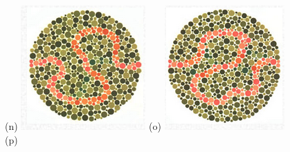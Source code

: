 \documentclass[	12pt, Times, openright, twoside, a4paper, english, brazil]{abntex2}
\begin{document}
\begin{apendicesenv}
\begin{figure}[!htb]
(n)
\endminipage\hfill
{}
\centering
{\includegraphics[width=\linewidth]{ishihara-fuga/figureIshihara36.png}}
(o)
\endminipage\hfill
{}
\centering
{\includegraphics[width=\linewidth]{ishihara-fuga/figureIshihara37.png}}
(p)
\endminipage\hfill



\end{figure}
\end{apendicesenv}
\end{document}
